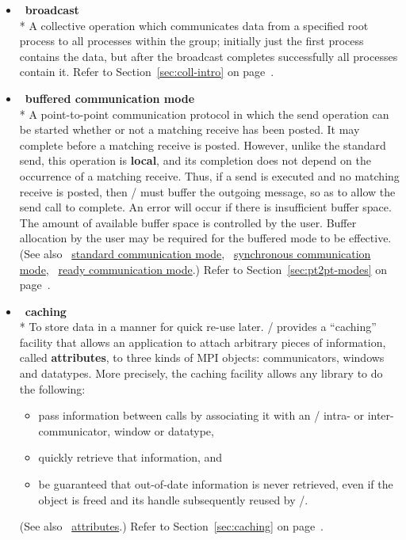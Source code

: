 \begin{itemize}
\label{glossary:broadcast}
\item  ~\hypertarget{glossary:broadcast}{\textbf{broadcast}} \\*
A collective operation which communicates data from a specified root process to all processes within the group;
initially just the first process contains the data, but after the
broadcast completes successfully all processes contain it.
Refer to Section~\ref{sec:coll-intro} on page~\pageref{sec:coll-intro}.

\label{glossary:buffered_communication_mode}
\item  ~\hypertarget{glossary:buffered_communication_mode}{\textbf{buffered communication mode}} \\*
A point-to-point communication protocol in which the
send operation can be started whether or not a
matching receive has been posted.
It may complete before a matching receive is posted.  However, unlike
the standard send, this operation is {\bf local}, and its
completion does not depend on the occurrence of a matching receive.  Thus, if a
send is executed and no matching receive is posted, then \MPI/ must buffer the
outgoing message, so as to allow the send call to complete.   An error will
occur if there is insufficient buffer space.   The amount of available buffer
space is controlled by the user.
Buffer allocation by the user may be required for the buffered mode to be
effective. 
(See also ~\hyperlink{glossary:standard_communication_mode}{standard communication mode}, 
~\hyperlink{glossary:synchronous_communication_mode}{synchronous communication mode},
~\hyperlink{glossary:ready_communication_mode}{ready communication mode}.)
Refer to Section~\ref{sec:pt2pt-modes} on page~\pageref{sec:pt2pt-modes}.

\label{glossary:caching}
\item  ~\hypertarget{glossary:caching}{\textbf{caching}} \\*
To store data in a manner for quick re-use later.
\MPI/ provides a ``caching'' facility that allows an application to
attach arbitrary pieces of information, called {\bf attributes}, to
three kinds of MPI objects: communicators, windows and datatypes.
More precisely, the caching
facility allows any library to do the following:
\begin{itemize}
\item
  pass information between calls by associating it
  with an \MPI/ intra- or in\-ter-\-com\-mun\-i\-ca\-tor, 
window or datatype,
\item quickly retrieve that information, and
\item
 be guaranteed that out-of-date information is never retrieved, even if
 the object is freed and its handle subsequently reused by \MPI/.
\end{itemize}
(See also ~\hyperlink{glossary:attributes}{attributes}.)
Refer to Section~\ref{sec:caching} on page~\pageref{sec:caching}.


\end{itemize}
